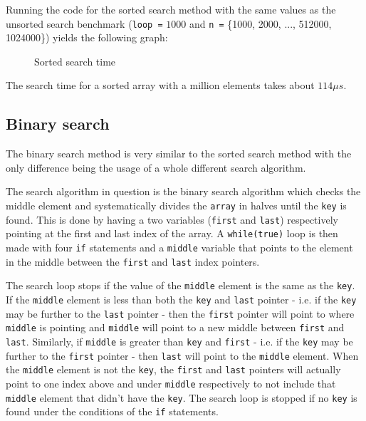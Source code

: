 \documentclass[a4paper,11pt]{article}
\begin{document}
Running the code for the sorted search method with the same values
as the unsorted search benchmark ({\tt loop =} $1000$ and 
{\tt n =} \{1000, 2000, ..., 512000, 1024000\}) yields the following 
graph:

\begin{figure}[h]
  \centering
  \caption{Sorted search time}
  \label{fig:plot2}
\end{figure}

The search time for a sorted array with a million elements takes about 
$ 114 \mu s$.

\subsection*{Binary search}

The binary search method is very similar to the sorted search method
with the only difference being the usage of a whole different search 
algorithm.

The search algorithm in question is the binary search algorithm which
checks the middle element and systematically divides the {\tt array} 
in halves until the {\tt key} is found. This is done by having a two
variables ({\tt first} and {\tt last}) respectively pointing at the 
first and last index of the array. A {\tt while(true)} loop is then
made with four {\tt if} statements and a {\tt middle} variable that 
points to the element in the middle between the {\tt first} and 
{\tt last} index pointers. 

The search loop stops if the value of the {\tt middle} element is the 
same as the {\tt key}. If the {\tt middle} element is less than both
the {\tt key} and {\tt last} pointer - i.e. if the {\tt key} may be 
further to the {\tt last} pointer - then the {\tt first} pointer will 
point to where {\tt middle} is pointing and {\tt middle} will point to 
a new middle between {\tt first} and {\tt last}. Similarly, if 
{\tt middle} is greater than {\tt key} and {\tt first} - i.e. if the 
{\tt key} may be further to the {\tt first} pointer - then {\tt last} 
will point to the {\tt middle} element. When the {\tt middle} element 
is not the {\tt key}, the {\tt first} and {\tt last} pointers will
actually point to one index above and under {\tt middle} respectively 
to not include that {\tt middle} element that didn't have the 
{\tt key}. The search loop is stopped if no {\tt key} is found under
the conditions of the {\tt if} statements.
\end{document}
